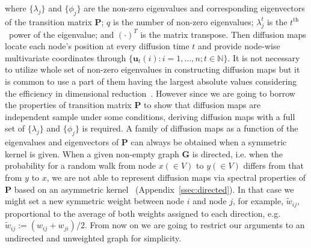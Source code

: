 \documentclass[11pt]{article}
\theoremstyle{definition}
\begin{document}
	where $\{ \lambda_{j} \}$ and $\{ \phi_{j}  \}$ are the non-zero eigenvalues and corresponding eigenvectors of the transition matrix $\mathbf{P}$; $q$ is the number of non-zero eigenvalues; $\lambda^{t}_{j}$ is the $t^{\mbox{th}}$~power of the eigenvalue; and $(\cdot)^{T}$ is the matrix transpose. Then diffusion maps locate each node's position at every diffusion time $t$ and provide node-wise multivariate coordinates through $\{\mathbf{u}_{t}(i) : i = 1, \ldots, n;  t  \in \mathbb{N} \}$. It is not necessary to utilize whole set of non-zero eigenvalues in constructing diffusion maps but it is common to use a part of them having the largest absolute values considering the efficiency in dimensional reduction~\cite{coifman2006diffusion}. However since we are going to borrow the properties of transition matrix $\mathbf{P}$ to show that diffusion maps are independent sample under some conditions, deriving diffusion maps with a full set of $\{ \lambda_{j} \}$ and $\{ \phi_{j}  \}$ is required. A family of diffusion maps as a function of the eigenvalues and eigenvectors of $\mathbf{P}$ can always be obtained when a symmetric kernel is given. When a given non-empty graph $\mathbf{G}$ is directed, i.e. when the probability for a random walk from node $x (\in V)$ to $y (\in V)$ differs from that from $y$ to $x$, we are not able to represent diffusion maps via spectral properties of $\mathbf{P}$ based on an asymmetric kernel~\cite{tang2010graph} (Appendix~\ref{ssec:directed}). In that case we might set a new symmetric weight between node $i$ and node $j$, for example, $\tilde{w}_{ij}$, proportional to the average of both weights assigned to each direction, e.g. $\tilde{w}_{ij} := (w_{ij} + w_{ji} ) / 2$. From now on we are going to restrict our arguments to an undirected and unweighted graph for simplicity.
	
\end{document}
